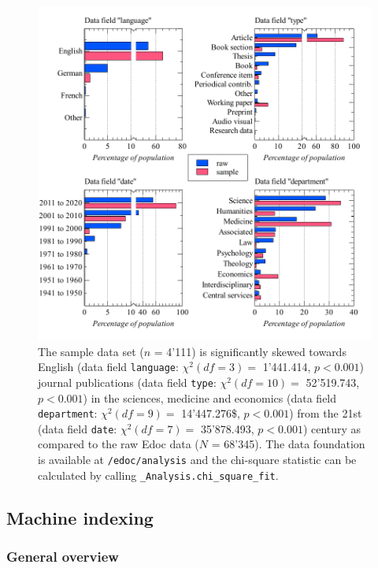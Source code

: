 \begin{figure}
\centering
\includegraphics{images/raw_sample_analysis.pdf}
\caption{The sample data set (\(n\) = 4'111) is significantly skewed
towards English (data field \texttt{language}: \(\chi^2 (df=3) =\)
1'441.414, \(p < 0.001\)) journal publications (data field
\texttt{type}: \(\chi^2 (df=10) =\) 52'519.743, \(p < 0.001\)) in the
sciences, medicine and economics (data field \texttt{department}:
\(\chi^2 (df=9) =\) 14'447.276\$, \(p < 0.001\)) from the 21st (data
field \texttt{date}: \(\chi^2 (df=7) =\) 35'878.493, \(p < 0.001\))
century as compared to the raw Edoc data (\(N\) = 68'345). The data
foundation is available at \texttt{/edoc/analysis} and the chi-square
statistic can be calculated by calling
\texttt{\_Analysis.chi\_square\_fit}.}
\end{figure}

\hypertarget{machine-indexing}{%
\subsection{Machine indexing}\label{machine-indexing}}

\hypertarget{general-overview}{%
\subsubsection{General overview}\label{general-overview}}

